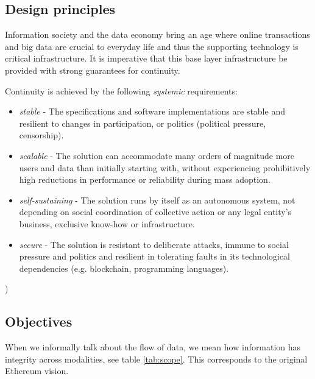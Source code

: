 \subsection{Design principles \statusorange}\label{sec:design-principles}
 

Information society and the data economy bring an age where online transactions and big data are crucial to everyday life and thus the supporting technology is critical infrastructure. It is imperative that this base layer infrastructure be provided with strong guarantees for continuity. 

Continuity is achieved by the following \emph{systemic} requirements:

\begin{itemize}
\item \emph{stable} - The specifications and software implementations are stable and resilient to changes in participation, or politics (political pressure, censorship).
\item \emph{scalable} - The solution can accommodate many orders of magnitude more users and data than initially starting with, without experiencing prohibitively high reductions in performance or reliability during mass adoption.
\item \emph{self-sustaining} - The solution runs by itself as an autonomous system, not depending on social coordination of collective action or any legal entity's business, exclusive know-how or infrastructure.   
\item \emph{secure} - The solution is resistant to deliberate attacks, immune to  social pressure and politics and resilient in tolerating faults in its technological dependencies (e.g. blockchain, programming languages). 
\end{itemize}
)



\subsection{Objectives \statusyellow}\label{sec:objectives}


When we informally talk about the flow of data, we mean how information has  integrity across modalities, see table \ref{tab:scope}. This corresponds to the original Ethereum vision.

